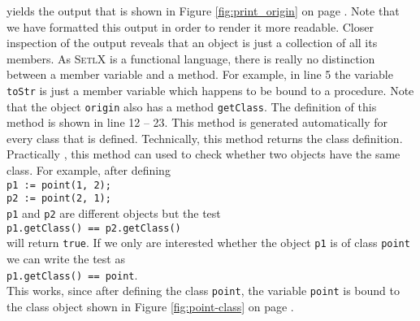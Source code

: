 yields the output that is shown in Figure \ref{fig:print_origin} on page \pageref{fig:print_origin}.
Note that we have formatted this output in order to render it more readable.  Closer inspection of the
output reveals that an object is just a collection of all its members.  As \textsc{SetlX} is a functional
language, there is really no distinction between a member variable and a method.  For example, in
line 5 the variable \texttt{toStr} is just a member variable which happens to be bound to a
procedure.  Note that the object \texttt{origin} also has a method \texttt{getClass}.
The definition of this method is shown in line 12 -- 23.  This
method is generated automatically for every class that is defined.  Technically,
this method returns the class definition.  Practically , this method can used
to check whether two objects have the same class.  For example, after defining 
\\[0.2cm]
\hspace*{1.3cm} \texttt{p1 := point(1, 2);} \\
\hspace*{1.3cm} \texttt{p2 := point(2, 1);} 
\\[0.2cm]
\texttt{p1} and \texttt{p2} are different objects but the test
\\[0.2cm]
\hspace*{1.3cm}
\texttt{p1.getClass() == p2.getClass()}
\\[0.2cm]
will return \texttt{true}.  If we only are interested whether the object \texttt{p1} is of class
\texttt{point} we can write the test as
\\[0.2cm]
\hspace*{1.3cm}
\texttt{p1.getClass() == point}.
\\[0.2cm]
This works, since after defining the class \texttt{point}, the variable \texttt{point} is bound to
the class object shown in Figure \ref{fig:point-class} on page \pageref{fig:point-class}.

